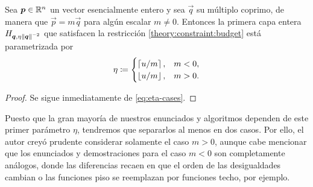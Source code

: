 \begin{lemma}
	\label{phase-1:lemma:eta}
	Sea $\boldsymbol{p} \in \mathbb{R}^n$ un vector esencialmente entero y sea $\vec{q}$ su múltiplo coprimo, de
	manera que $\vec{p} = m\vec{q}$ para algún escalar $m \neq 0$. Entonces la primera capa entera
	$H_{\boldsymbol{q}, \eta\left\lVert \boldsymbol{q} \right\rVert^{-2}}$ que satisfacen la restricción \eqref{theory:constraint:budget} está
	parametrizada por
	\begin{equation}
		\label{lemma:eq:eta-cases}
		\eta \coloneq \begin{cases}
			\left\lceil u/m \right\rceil, & m < 0, \\
			\left\lfloor u/m \right\rfloor, & m > 0.
		\end{cases}
	\end{equation}
\end{lemma}
\begin{proof}
	Se sigue inmediatamente de \eqref{eq:eta-cases}.
\end{proof}

Puesto que la gran mayoría de nuestros enunciados y algoritmos dependen de este primer parámetro
$\eta$, tendremos que separarlos al menos en dos casos. Por ello, el autor creyó prudente
considerar solamente el caso $m > 0$, aunque cabe mencionar que los enunciados y demostraciones para
el caso $m < 0$ son completamente análogos, donde las diferencias recaen en que el orden de las
desigualdades cambian o las funciones piso se reemplazan por funciones techo, por ejemplo.

